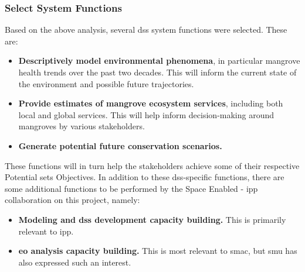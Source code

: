 %
%
%
%
%
%
%
%

\subsubsection{Select System Functions} \label{sec:rio-saf-function-result}

Based on the above analysis, several \ac{dss} system functions were selected. These are:

\begin{itemize}[itemsep=0pt,parsep=0pt]
    \item{\textbf{Descriptively model environmental phenomena}, in particular mangrove health trends over the past two decades. This will inform the current state of the environment and possible future trajectories.}
    \item{\textbf{Provide estimates of mangrove ecosystem services}, including both local and global services. This will help inform decision-making around mangroves by various stakeholders.}
    \item{\textbf{Generate potential future conservation scenarios.}}
\end{itemize}

These functions will in turn help the stakeholders achieve some of their respective Potential \ac{sets} Objectives. In addition to these \ac{dss}-specific functions, there are some additional functions to be performed by the Space Enabled - \ac{ipp} collaboration on this project, namely:

\begin{itemize}[itemsep=0pt,parsep=0pt]
    \item{\textbf{Modeling and \ac{dss} development capacity building.} This is primarily relevant to \ac{ipp}.}
    \item{\textbf{\ac{eo} analysis capacity building.} This is most relevant to \ac{smac}, but \ac{smu} has also expressed such an interest.}
\end{itemize}


